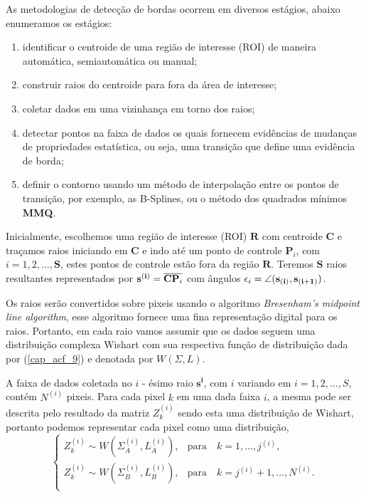 As metodologias de detecção de bordas ocorrem em diversos estágios, abaixo enumeramos os estágios:
\begin{enumerate}
	\item identificar o centroide de uma região de interesse (ROI) de maneira automática, semiautomática ou manual;
	\item construir raios do centroide para fora da área de interesse;
	\item coletar dados em uma vizinhança em torno dos raios;
	\item detectar pontos na faixa de dados os quais fornecem evidências de mudanças de propriedades estatística, ou seja, uma transição que define uma evidência de borda;
	\item definir o contorno usando um método de interpolação entre os pontos de transição, por exemplo, as B-Splines, ou o método dos quadrados mínimos \textbf{MMQ}.
\end{enumerate}

Inicialmente, escolhemos uma região de interesse (ROI) $\mathbf{R}$ com centroide $\mathbf{C}$ e traçamos raios iniciando em $\mathbf{C}$ e indo até um ponto de controle $\mathbf{P}_i$, com $i=1,2,\dots, \mathbf{S}$, estes pontos de controle estão fora da região $\mathbf{R}$. Teremos $\mathbf{S}$ raios resultantes representados por ${\bf s^{(i)}}=\overline{\mathbf{CP}_i}$ com ângulos $\epsilon_{i}=\angle ({\bf s_{(i)}},{\bf s_{(i+1)}})$. 

Os raios serão convertidos sobre pixeis usando o algoritmo {\it Bresenham's midpoint line algorithm}, esse algoritmo fornece uma fina representação digital para os raios. Portanto, em cada raio vamos assumir que os dados seguem uma distribuição complexa Wishart com sua respectiva função de distribuição dada por (\ref{cap_acf_9}) e denotada por $W(\Sigma,L)$.

A faixa de dados coletada no $\mathit{i}$ - ésimo raio $\mathbf{s^{i}}$, com $i$ variando em $i=1,2,\dots, S$, contém $N^{(i)}$ pixeis. Para cada pixel $\mathit{k}$ em uma dada faixa $\mathit{i}$, a mesma pode ser descrita pelo resultado da matriz $Z_{k}^{(i)}$ sendo esta uma distribuição de Wishart, portanto podemos representar cada pixel como uma distribuição,  
\begin{equation}\label{cap_acf_13}
 \left\{
\begin{array}{cl}
	Z_{k}^{(i)}\sim W(\Sigma_{A}^{(i)},L_{A}^{(i)}),& \mbox{para}\quad k=1,\dots,j^{(i)} , \\
	Z_{k}^{(i)}\sim W(\Sigma_{B}^{(i)},L_{B}^{(i)}),& \mbox{para}\quad k=j^{(i)} + 1,\dots,N^{(i)}.  \\
\end{array}
\right.
\end{equation}


